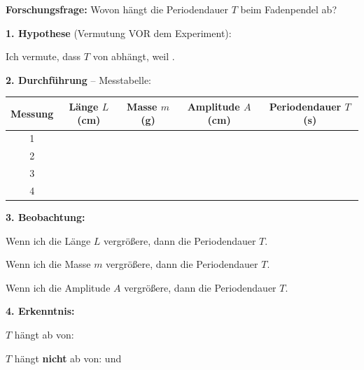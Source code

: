 \documentclass[11pt, a4paper]{article}
\newcommand{\luecke}[1]{\underline{\hspace{#1}}}
\begin{document}
\begin{protokollkasten}[title={\textbf{P1: Versuchsprotokoll -- Fadenpendel}}]

\textbf{Forschungsfrage:} Wovon hängt die Periodendauer $T$ beim Fadenpendel ab?

\vspace{0.5em}
\textbf{1. Hypothese} (Vermutung VOR dem Experiment):

Ich vermute, dass $T$ von \luecke{3cm} abhängt, weil \luecke{5cm}.

\vspace{0.5em}
\textbf{2. Durchführung} -- Messtabelle:

\vspace{0.3em}
\begin{tabular}{|c|c|c|c|c|}
\hline
\textbf{Messung} & \textbf{Länge $L$ (cm)} & \textbf{Masse $m$ (g)} & \textbf{Amplitude $A$ (cm)} & \textbf{Periodendauer $T$ (s)} \\
\hline
1 & & & & \\
\hline
2 & & & & \\
\hline
3 & & & & \\
\hline
4 & & & & \\
\hline
\end{tabular}

\vspace{0.5em}
\textbf{3. Beobachtung:}

Wenn ich die Länge $L$ vergrößere, dann \luecke{4cm} die Periodendauer $T$.

Wenn ich die Masse $m$ vergrößere, dann \luecke{4cm} die Periodendauer $T$.

Wenn ich die Amplitude $A$ vergrößere, dann \luecke{4cm} die Periodendauer $T$.

\vspace{0.5em}
\textbf{4. Erkenntnis:}

$T$ hängt ab von: \luecke{3cm}

$T$ hängt \textbf{nicht} ab von: \luecke{3cm} und \luecke{3cm}
\end{protokollkasten}

\end{document}
